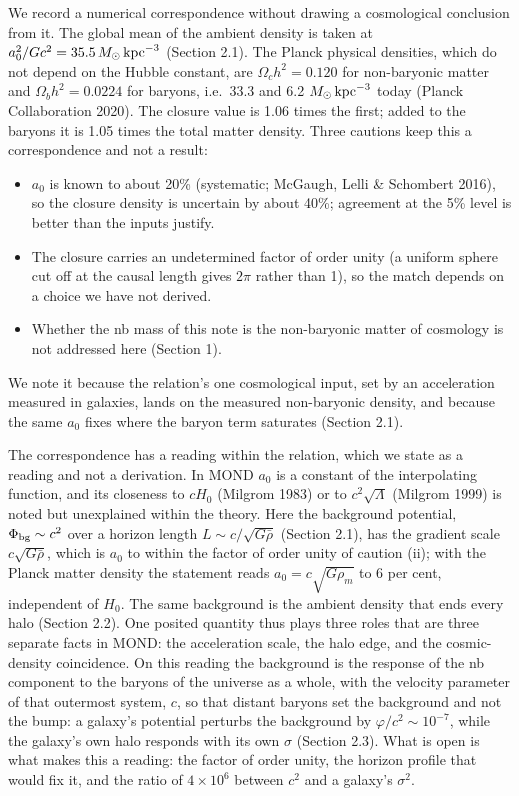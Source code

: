 \documentclass[
  10pt,
]{article}
\begin{document}
We record a numerical correspondence without drawing a cosmological
conclusion from it. The global mean of the ambient density is taken at
$a_0^2/Gc^2=35.5\,M_\odot\,{\rm kpc}^{-3}$ (Section 2.1). The Planck
physical densities, which do not depend on the Hubble constant, are
$\Omega_ch^2=0.120$ for non-baryonic matter and $\Omega_bh^2=0.0224$ for
baryons, i.e.\ 33.3 and 6.2 $M_\odot\,{\rm kpc}^{-3}$ today (Planck
Collaboration 2020). The closure value is 1.06 times the first; added to
the baryons it is 1.05 times the total matter density. Three cautions keep
this a correspondence and not a result:
\begin{itemize}
\item[(i)] $a_0$ is known to about 20\% (systematic; McGaugh, Lelli \& Schombert 2016), so the closure density is uncertain by about 40\%; agreement at the 5\% level is better than the inputs justify.
\item[(ii)] The closure carries an undetermined factor of order unity (a uniform sphere cut off at the causal length gives $2\pi$ rather than 1), so the match depends on a choice we have not derived.
\item[(iii)] Whether the nb mass of this note is the non-baryonic matter of cosmology is not addressed here (Section 1).
\end{itemize}
We note it because the relation's one cosmological input, set by an acceleration measured in galaxies, lands on the measured non-baryonic density, and because the same $a_0$ fixes where the baryon term saturates (Section 2.1).

The correspondence has a reading within the relation, which we state as a reading and not a derivation. In MOND $a_0$ is a constant of the interpolating function, and its closeness to $cH_0$ (Milgrom 1983) or to $c^2\sqrt{\Lambda}$ (Milgrom 1999) is noted but unexplained within the theory. Here the background potential, $\Phi_{\rm bg}\sim c^2$ over a horizon length $L\sim c/\sqrt{G\bar\rho}$ (Section 2.1), has the gradient scale $c\sqrt{G\bar\rho}$, which is $a_0$ to within the factor of order unity of caution (ii); with the Planck matter density the statement reads $a_0=c\sqrt{G\rho_m}$ to 6 per cent, independent of $H_0$. The same background is the ambient density that ends every halo (Section 2.2). One posited quantity thus plays three roles that are three separate facts in MOND: the acceleration scale, the halo edge, and the cosmic-density coincidence. On this reading the background is the response of the nb component to the baryons of the universe as a whole, with the velocity parameter of that outermost system, $c$, so that distant baryons set the background and not the bump: a galaxy's potential perturbs the background by $\varphi/c^2\sim10^{-7}$, while the galaxy's own halo responds with its own $\sigma$ (Section 2.3). What is open is what makes this a reading: the factor of order unity, the horizon profile that would fix it, and the ratio of $4\times10^6$ between $c^2$ and a galaxy's $\sigma^2$.
\end{document}
